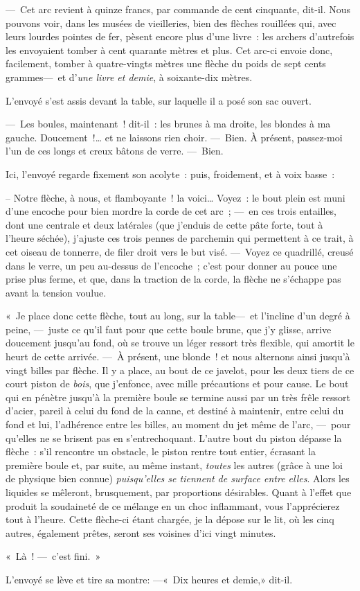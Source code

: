 \documentclass[french,twoside]{book} %
\begin{document}
— Cet arc revient à quinze francs, par commande de cent cinquante, dit-il. Nous pouvons voir, dans les musées de vieilleries, bien des flèches rouillées qui, avec leurs lourdes pointes de fer, pèsent encore plus d’une livre : les archers d’autrefois les envoyaient tomber à cent quarante mètres et plus. Cet arc-ci envoie donc, facilement, tomber à quatre-vingts mètres une flèche du poids de sept cents grammes— et d’\emph{une livre et demie}, à soixante-dix mètres.\par
L’envoyé s’est assis devant la table, sur laquelle il a posé son sac ouvert.\par
— Les boules, maintenant ! dit-il : les brunes à ma droite, les blondes à ma gauche. Doucement !… et ne laissons rien choir. — Bien. À présent, passez-moi l’un de ces longs et creux bâtons de verre. — Bien.\par
Ici, l’envoyé regarde fixement son acolyte : puis, froidement, et à voix basse :\par
   – Notre flèche, à nous, et flamboyante ! la voici… Voyez : le bout plein est muni d’une encoche pour bien mordre la corde de cet arc ; — en ces trois entailles, dont une centrale et deux latérales (que j’enduis de cette pâte forte, tout à l’heure séchée), j’ajuste ces trois pennes de parchemin qui permettent à ce trait, à cet oiseau de tonnerre, de filer droit vers le but visé. — Voyez ce quadrillé, creusé dans le verre, un peu au-dessus de l’encoche ; c’est pour donner au pouce une prise plus ferme, et que, dans la traction de la corde, la flèche ne s’échappe pas avant la tension voulue.\par
« Je place donc cette flèche, tout au long, sur la table— et l’incline d’un degré à peine, — juste ce qu’il faut pour que cette boule brune, que j’y glisse, arrive doucement jusqu’au fond, où se trouve un léger ressort très flexible, qui amortit le heurt de cette arrivée. — À présent, une blonde ! et nous alternons ainsi jusqu’à vingt billes par flèche. Il y a place, au bout de ce javelot, pour les deux tiers de ce court piston de \emph{bois}, que j’enfonce, avec mille précautions   et pour cause. Le bout qui en pénètre jusqu’à la première boule se termine aussi par un très frêle ressort d’acier, pareil à celui du fond de la canne, et destiné à maintenir, entre celui du fond et lui, l’adhérence entre les billes, au moment du jet même de l’arc, — pour qu’elles ne se brisent pas en s’entrechoquant. L’autre bout du piston dépasse la flèche : s’il rencontre un obstacle, le piston rentre tout entier, écrasant la première boule et, par suite, au même instant, \emph{toutes} les autres (grâce à une loi de physique bien connue) \emph{puisqu’elles se tiennent de surface entre elles}. Alors les liquides se mêleront, brusquement, par proportions désirables. Quant à l’effet que produit la soudaineté de ce mélange en un choc inflammant, vous l’apprécierez tout à l’heure. Cette flèche-ci étant chargée, je la dépose sur le lit, où les cinq autres, également prêtes, seront ses voisines d’ici vingt minutes.\par
« Là ! — c’est fini. »\par
L’envoyé se lève et tire sa montre: —« Dix heures et demie,» dit-il.
\end{document}
